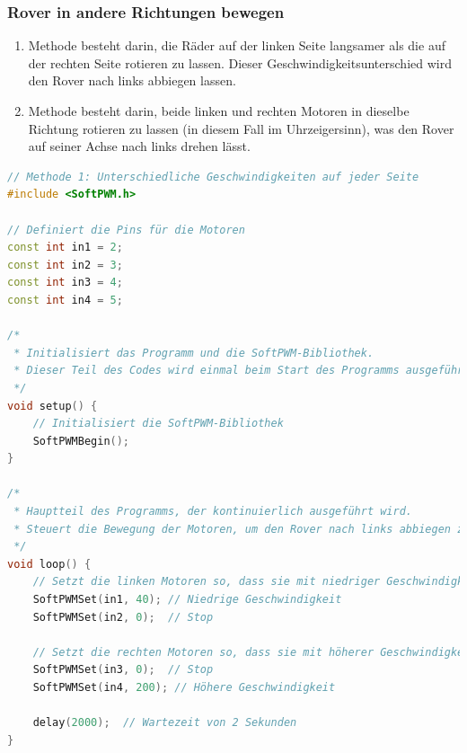 \documentclass{vorlage-design-main}
\begin{document}
\hypertarget{rover-in-andere-richtungen-bewegen}{%
\subsubsection{Rover in andere Richtungen
bewegen}\label{rover-in-andere-richtungen-bewegen}}

\begin{enumerate}
\def\labelenumi{\arabic{enumi}.}
\item
  Methode besteht darin, die Räder auf der linken Seite langsamer als
  die auf der rechten Seite rotieren zu lassen. Dieser
  Geschwindigkeitsunterschied wird den Rover nach links abbiegen lassen.
\item
  Methode besteht darin, beide linken und rechten Motoren in dieselbe
  Richtung rotieren zu lassen (in diesem Fall im Uhrzeigersinn), was den
  Rover auf seiner Achse nach links drehen lässt.
\end{enumerate}

\begin{lstlisting}[language={C++}]
// Methode 1: Unterschiedliche Geschwindigkeiten auf jeder Seite
#include <SoftPWM.h>

// Definiert die Pins für die Motoren
const int in1 = 2;
const int in2 = 3;
const int in3 = 4;
const int in4 = 5;

/*
 * Initialisiert das Programm und die SoftPWM-Bibliothek.
 * Dieser Teil des Codes wird einmal beim Start des Programms ausgeführt.
 */
void setup() {
    // Initialisiert die SoftPWM-Bibliothek
    SoftPWMBegin();
}

/*
 * Hauptteil des Programms, der kontinuierlich ausgeführt wird.
 * Steuert die Bewegung der Motoren, um den Rover nach links abbiegen zu lassen.
 */
void loop() {
    // Setzt die linken Motoren so, dass sie mit niedriger Geschwindigkeit gegen den Uhrzeigersinn drehen
    SoftPWMSet(in1, 40); // Niedrige Geschwindigkeit
    SoftPWMSet(in2, 0);  // Stop

    // Setzt die rechten Motoren so, dass sie mit höherer Geschwindigkeit im Uhrzeigersinn drehen
    SoftPWMSet(in3, 0);  // Stop
    SoftPWMSet(in4, 200); // Höhere Geschwindigkeit

    delay(2000);  // Wartezeit von 2 Sekunden
}
\end{lstlisting}
\end{document}
